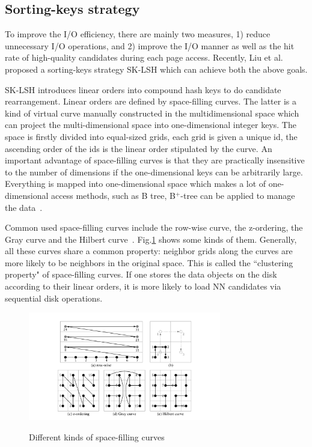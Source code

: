 \documentclass[twocolumn]{svjour3}          %
\begin{document}
\subsection{Sorting-keys strategy}
To improve the I/O efficiency, there are mainly two measures, 1) reduce unnecessary I/O operations, and 2) improve the I/O manner as well as the hit rate of high-quality candidates during each page access. Recently, Liu et al. proposed a sorting-keys strategy SK-LSH which can achieve both the above goals. 

SK-LSH introduces linear orders into compound hash keys to do candidate rearrangement. Linear orders are defined by space-filling curves. The latter is a kind of virtual curve manually constructed in the multidimensional space which can project the multi-dimensional space into one-dimensional integer keys. The space is firstly divided into equal-sized grids, each grid is given a unique id, the ascending order of the ids is the linear order stipulated by the curve. An important advantage of space-filling curves is that they are practically insensitive to the number of dimensions if the one-dimensional keys can be arbitrarily large. Everything is mapped into one-dimensional space which makes a lot of one-dimensional access methods, such as B tree, B$^+$-tree can be applied to manage the data~\cite{MultiDAccess98}.

Common used space-filling curves include the row-wise curve, the z-ordering, the Gray curve and the Hilbert curve~\cite{MultiDAccess98}. Fig.\ref{fig:sfc} shows some kinds of them. Generally, all these curves share a common property: neighbor grids along the curves are more likely to be neighbors in the original space. This is called the ``clustering property" of space-filling curves. If one stores the data objects on the disk according to their linear orders, it is more likely to load NN candidates via sequential disk operations.
\begin{figure}
  \centering
  \includegraphics[width=0.75\textwidth]{linear-order.pdf}\\
  \caption{Different kinds of space-filling curves}\label{fig:sfc}
\end{figure}
\end{document}
